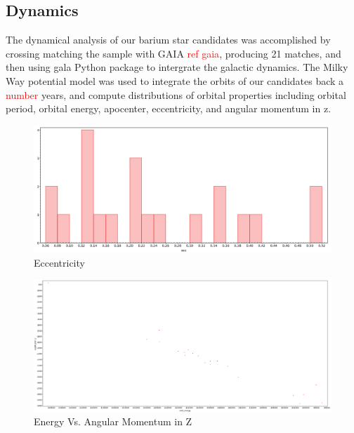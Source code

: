 \documentclass[a4paper,fleqn,usenatbib]{mnras}
\newcommand{\todo}[1]{\textcolor{red}{#1}}
\begin{document}
\subsection{Dynamics}
The dynamical analysis of our barium star candidates was accomplished by crossing matching the sample with GAIA \todo{ref gaia}, producing 21 matches, and then using gala Python package to intergrate the galactic dynamics. The Milky Way potential model was used to integrate the orbits of our candidates back a \todo{number} years, and compute distributions of orbital properties including orbital period, orbital energy, apocenter, eccentricity, and angular momentum in z.

\begin{figure}
	\includegraphics[width=\columnwidth]{ECCdummy.png}
    \caption{Eccentricity}
    \label{fig:figure3}
\end{figure}

\begin{figure}
	\includegraphics[width=\columnwidth]{energy_angmomz.png}
    \caption{Energy Vs. Angular Momentum in Z}
    \label{fig:figure3}
\end{figure}
\end{document}
